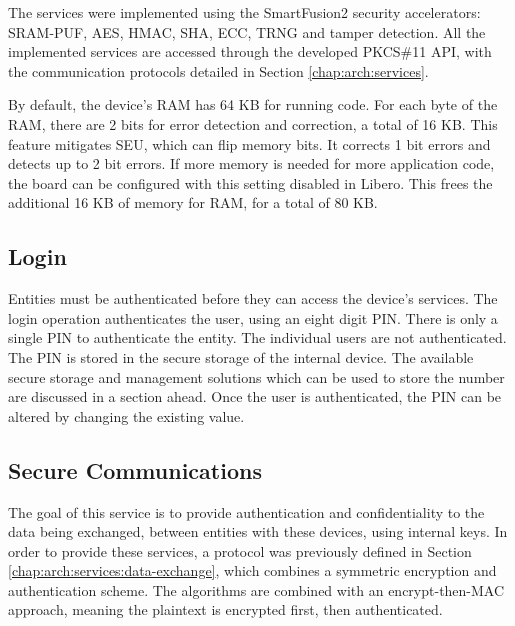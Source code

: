The services were implemented using the SmartFusion2 security accelerators: SRAM-PUF, AES, HMAC, SHA, ECC, TRNG and tamper detection.
All the implemented services are accessed through the developed PKCS\#11 API, with the communication protocols detailed in Section \ref{chap:arch:services}.

By default, the device's \ac{RAM} has 64 KB for running code. For each byte of the RAM, there are 2 bits for error detection and correction, a total of 16 KB. This feature mitigates \ac{SEU}, which can flip memory bits. It corrects 1 bit errors and detects up to 2 bit errors. If more memory is needed for more application code, the board can be configured with this setting disabled in Libero. This frees the additional 16 KB of memory for RAM, for a total of 80 KB.

\subsection{Login}\label{chap:implementation:services:authentication}

Entities must be authenticated before they can access the device's services. The login operation authenticates the user, using an eight digit PIN.
There is only a single PIN to authenticate the entity. The individual users are not authenticated.
The PIN is stored in the secure storage of the internal device. The available secure storage and management solutions which can be used to store the number are discussed in a section ahead.
Once the user is authenticated, the PIN can be altered by changing the existing value.

\subsection{Secure Communications}\label{chap:implementation:services:secure}

The goal of this service is to provide authentication and confidentiality to the data being exchanged, between entities with these devices, using internal keys.
In order to provide these services, a protocol was previously defined in Section \ref{chap:arch:services:data-exchange}, which combines a symmetric encryption and authentication scheme. The algorithms are combined with an encrypt-then-MAC approach, meaning the plaintext is encrypted first, then authenticated.

